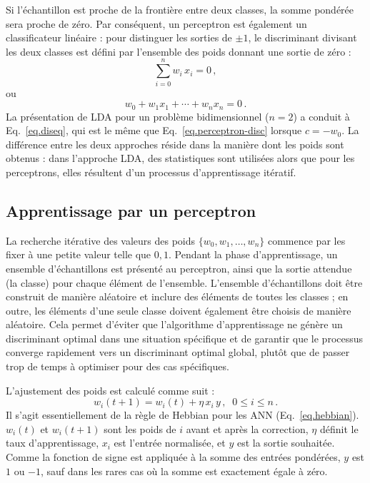 Si l'échantillon est proche de la frontière entre deux classes, la somme pondérée sera proche de zéro. Par conséquent, un perceptron est également un classificateur linéaire : pour distinguer les sorties de $\pm 1$, le discriminant divisant les deux classes est défini par l'ensemble des poids donnant une sortie de zéro :
\[
\sum_{i=0}^{n} w_i\,x_i=0\,,
\]
ou
\begin{equation}
w_0 + w_1x_1 + \cdots + w_nx_n = 0\,.\label{eq.perceptron-disc}
\end{equation}
La présentation de LDA pour un problème bidimensionnel ($n=2$) a conduit à Eq.~\ref{eq.diseq}, qui est le même que Eq.~\ref{eq.perceptron-disc} lorsque $c=-w_0$. La différence entre les deux approches réside dans la manière dont les poids sont obtenus : dans l'approche LDA, des statistiques sont utilisées alors que pour les perceptrons, elles résultent d'un processus d'apprentissage itératif.

\subsection{Apprentissage par un perceptron}

La recherche itérative des valeurs des poids $\{w_0,w_1,\ldots,w_n\}$ commence par les fixer à une petite valeur telle que $0,1$. Pendant la phase d'apprentissage, un ensemble d'échantillons est présenté au perceptron, ainsi que la sortie attendue (la classe) pour chaque élément de l'ensemble. L'ensemble d'échantillons doit être construit de manière aléatoire et inclure des éléments de toutes les classes ; en outre, les éléments d'une seule classe doivent également être choisis de manière aléatoire. Cela permet d'éviter que l'algorithme d'apprentissage ne génère un discriminant optimal dans une situation spécifique et de garantir que le processus converge rapidement vers un discriminant optimal global, plutôt que de passer trop de temps à optimiser pour des cas spécifiques.

L'ajustement des poids est calculé comme suit :
\begin{equation}
w_i(t+1) = w_i(t) + \eta \,x_i \,y\,,\;\;0\leq i \leq n\,.\label{eq.perceptron-learn}
\end{equation}
Il s'agit essentiellement de la règle de Hebbian pour les ANN (Eq.~\ref{eq.hebbian}). $w_i(t)$ et $w_i(t+1)$ sont les poids de $i$ avant et après la correction, $\eta$ définit le taux d'apprentissage, $x_i$ est l'entrée normalisée, et $y$ est la sortie souhaitée. Comme la fonction de signe est appliquée à la somme des entrées pondérées, $y$ est $1$ ou $-1$, sauf dans les rares cas où la somme est exactement égale à zéro. 

